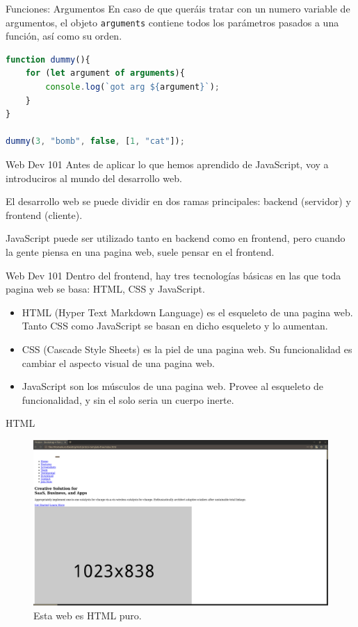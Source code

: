 \documentclass{beamer}
\begin{document}
\begin{frame}[fragile]{Funciones: Argumentos}
En caso de que queráis tratar con un numero variable de argumentos, el objeto {\verb|arguments|} contiene todos los parámetros pasados a una función, así como su orden.

\begin{lstlisting}[language=JavaScript]
function dummy(){
    for (let argument of arguments){
        console.log(`got arg ${argument}`);
    }
}

dummy(3, "bomb", false, [1, "cat"]);
\end{lstlisting}
\end{frame}

\begin{frame}{Web Dev 101}
Antes de aplicar lo que hemos aprendido de JavaScript, voy a introduciros al mundo del desarrollo web.

El desarrollo web se puede dividir en dos ramas principales: backend (servidor) y frontend (cliente).

JavaScript puede ser utilizado tanto en backend como en frontend, pero cuando la gente piensa en una pagina web, suele pensar en el frontend.
    
\end{frame}

\begin{frame}{Web Dev 101}
Dentro del frontend, hay tres tecnologías básicas en las que toda pagina web se basa: HTML, CSS y JavaScript.
\begin{itemize}
    \item HTML (Hyper Text Markdown Language) es el esqueleto de una pagina web. Tanto CSS como JavaScript se basan en dicho esqueleto y lo aumentan.
    \item CSS (Cascade Style Sheets) es la piel de una pagina web. Su funcionalidad es cambiar el aspecto visual de una pagina web.
    \item JavaScript son los músculos de una pagina web. Provee al esqueleto de funcionalidad, y sin el solo seria un cuerpo inerte.
\end{itemize}
\end{frame}

\begin{frame}{HTML}
\begin{figure}
    \centering
    \includegraphics[width=\textwidth]{images/nocss.png}
    \caption{Esta web es HTML puro.}
\end{figure}
\end{frame}
\end{document}
